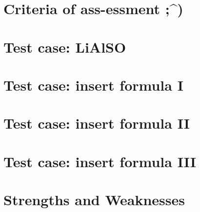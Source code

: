 \section{Criteria of ass-essment ;^)}
\section{Test case: LiAlSO}
\section{Test case: insert formula I}
\section{Test case: insert formula II}
\section{Test case: insert formula III}
\section{Strengths and Weaknesses}
